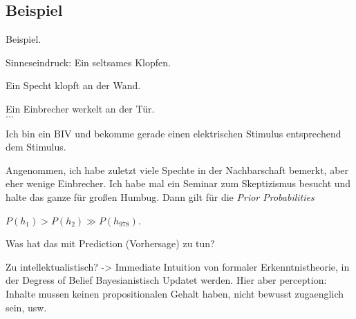 \documentclass[12pt, handout]{beamer}
\begin{document}
\subsection{Beispiel}

\begin{frame}
  Beispiel.
  \begin{description}[xxxxxxx]
  \item[$e$] {\small Sinneseindruck: Ein seltsames Klopfen.}
  \item[$h_1$] {\small Ein Specht klopft an der Wand.}
  \item[$h_2$] {\small Ein Einbrecher werkelt an der Tür.} \\ $...$
  \item[$h_{978}$] {\small Ich bin ein BIV und bekomme gerade einen
      elektrischen Stimulus entsprechend dem Stimulus.}
  \end{description}

  {\small Angenommen, ich habe zuletzt viele Spechte in der
    Nachbarschaft bemerkt, aber eher wenige Einbrecher. Ich habe mal
    ein Seminar zum Skeptizismus besucht und halte das ganze für großen Humbug. Dann gilt für die \emph{Prior Probabilities}}

  \begin{center}
  $P(h_1) > P(h_2) \gg P(h_{978})$.
  \end{center}

\end{frame}


\begin{frame}
  Was hat das mit Prediction (Vorhersage) zu tun?
\end{frame}

Zu intellektualistisch? -> Immediate Intuition von formaler
Erkenntnistheorie, in der Degress of Belief Bayesianistisch Updatet
werden. Hier aber perception: Inhalte mussen keinen propositionalen
Gehalt haben, nicht bewusst zugaenglich sein, usw.
\end{document}
